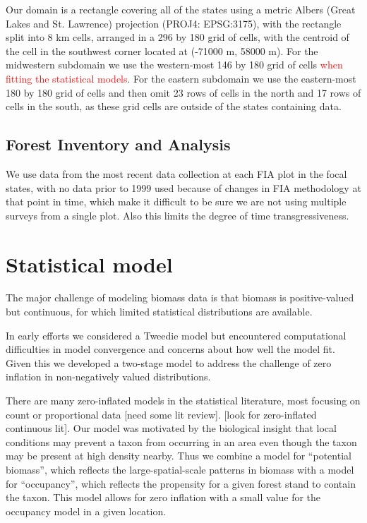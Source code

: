 \documentclass[12pt]{article}\usepackage[]{graphicx}\usepackage[]{color}
\begin{document}
Our domain is a rectangle covering all of the states using a metric
Albers (Great Lakes and St. Lawrence) projection (PROJ4: EPSG:3175),
with the rectangle split into 8 km cells, arranged in a 296 by 180
grid of cells, with the centroid of the cell in the southwest corner
located at (-71000 m, 58000 m). For the midwestern subdomain we use
the western-most 146 by 180 grid of cells\textcolor{red}{{} when fitting
the statistical models}. For the eastern subdomain we use the eastern-most
180 by 180 grid of cells and then omit 23 rows of cells in the north
and 17 rows of cells in the south, as these grid cells are outside
of the states containing data.


\subsection{Forest Inventory and Analysis}

We use data from the most recent data collection at each FIA plot
in the focal states, with no data prior to 1999 used because of changes
in FIA methodology at that point in time, which make it difficult
to be sure we are not using multiple surveys from a single plot. Also
this limits the degree of time transgressiveness. 


\section{Statistical model\label{sec:Statistical-model}}

The major challenge of modeling biomass data is that biomass is positive-valued
but continuous, for which limited statistical distributions are available.

In early efforts we considered a Tweedie model but encountered computational
difficulties in model convergence and concerns about how well the
model fit. Given this we developed a two-stage model to address the
challenge of zero inflation in non-negatively valued distributions.

There are many zero-inflated models in the statistical literature,
most focusing on count or proportional data {[}need some lit review{]}.
{[}look for zero-inflated continuous lit{]}. Our model was motivated
by the biological insight that local conditions may prevent a taxon
from occurring in an area even though the taxon may be present at
high density nearby. Thus we combine a model for ``potential biomass'',
which reflects the large-spatial-scale patterns in biomass with a
model for ``occupancy'', which reflects the propensity for a given
forest stand to contain the taxon. This model allows for zero inflation
with a small value for the occupancy model in a given location.
\end{document}
